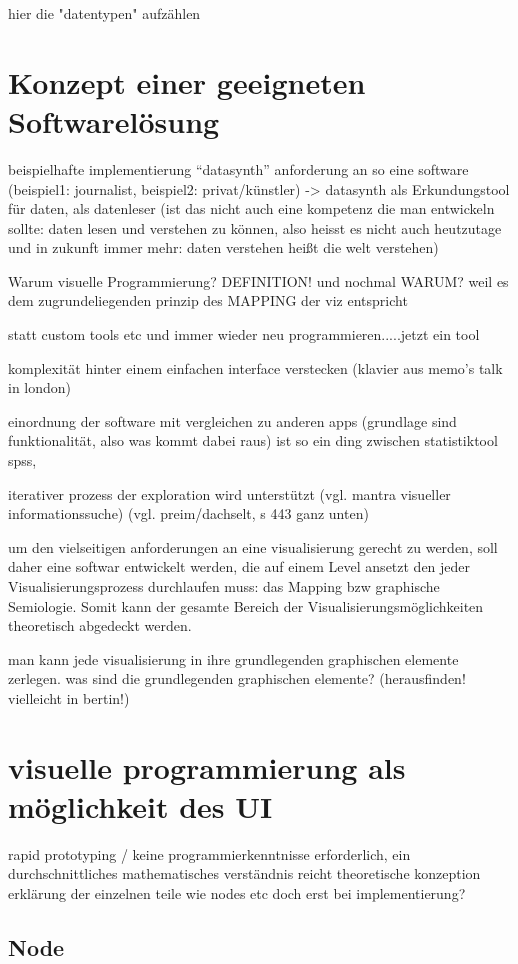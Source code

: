 \documentclass[a4paper, 12pt, onepage, pdftex, headsepline, footsepline]{scrreprt}
\begin{document}
hier die "datentypen" aufzählen

\section{Konzept einer geeigneten Softwarelösung}
beispielhafte implementierung “datasynth”
anforderung an so eine software (beispiel1: journalist, beispiel2: privat/künstler)
-> datasynth als Erkundungstool für daten, als datenleser (ist das nicht auch eine kompetenz die man entwickeln sollte: daten lesen und verstehen zu können, also heisst es nicht auch heutzutage und in zukunft immer mehr: daten verstehen heißt die welt verstehen)

Warum visuelle Programmierung? DEFINITION! und nochmal WARUM?
weil es dem zugrundeliegenden prinzip des MAPPING der viz entspricht

statt custom tools etc und immer wieder neu programmieren.....jetzt ein tool

komplexität hinter einem einfachen interface verstecken (klavier aus memo’s talk in london)

einordnung der software mit vergleichen zu anderen apps (grundlage sind funktionalität, also was kommt dabei raus) ist so ein ding zwischen statistiktool spss, 

iterativer prozess der exploration wird unterstützt (vgl. mantra visueller informationssuche) (vgl. preim/dachselt, s 443 ganz unten)

um den vielseitigen anforderungen an eine visualisierung gerecht zu werden, soll daher eine softwar entwickelt werden, die auf einem Level ansetzt den jeder Visualisierungsprozess durchlaufen muss: das Mapping bzw graphische Semiologie. Somit kann der gesamte Bereich der Visualisierungsmöglichkeiten theoretisch abgedeckt werden.

man kann jede visualisierung in ihre grundlegenden graphischen elemente zerlegen.
was sind die grundlegenden graphischen elemente? (herausfinden! vielleicht in bertin!)

\section{visuelle programmierung als möglichkeit des UI}
rapid prototyping / keine programmierkenntnisse erforderlich, ein durchschnittliches mathematisches verständnis reicht
theoretische konzeption
erklärung der einzelnen teile wie nodes etc doch erst bei implementierung?
\subsection{Node}
\end{document}
